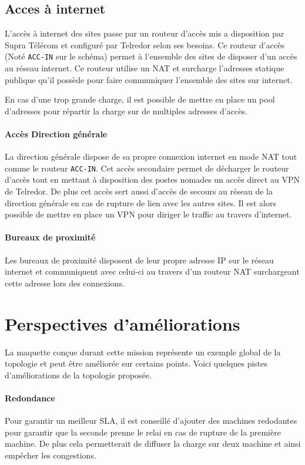\documentclass{article}
\newcommand{\tlr}{Telredor\xspace}
\newcommand{\spr}{Supra Télécom\xspace}
\begin{document}
\subsection{Acces à internet}

L'accès à internet des sites passe par un routeur d'accès mis a disposition par \spr et configuré par \tlr selon ses besoins.
Ce routeur d'accès (Noté \texttt{ACC-IN} sur le schéma) permet à l'ensemble des sites de disposer d'un accès au réseau internet.
Ce routeur utilise un NAT et surcharge l'adresses statique publique qu'il possède pour faire communiquer l'ensemble des sites sur internet.

En cas d'une trop grande charge, il est possible de mettre en place un pool d'adresses pour répartir la charge sur de multiples adresses d'accès.

\paragraph{Accès Direction générale}
La direction générale dispose de sa propre connexion internet en mode NAT tout comme le routeur \texttt{ACC-IN}.
Cet accès secondaire permet de décharger le routeur d'accès tout en mettant à disposition des postes nomades un accès direct au VPN de \tlr.
De plus cet accès sert aussi d'accès de secours au réseau de la direction générale en cas de rupture de lien avec les autres sites. Il est alors possible de mettre en place un VPN pour diriger le traffic au travers d'internet.

\paragraph{Bureaux de proximité} Les bureaux de proximité disposent de leur propre adresse IP sur le réseau internet et communiquent avec celui-ci au travers d'un routeur NAT surchargeant cette adresse lors des connexions.

\section{Perspectives d'améliorations}

La maquette conçue durant cette mission représente un exemple global de la topologie et peut être améliorée sur certains points.
Voici quelques pistes d'améliorations de la topologie proposée.

\paragraph{Redondance} Pour garantir un meilleur SLA, il est conseillé d'ajouter des machines redodantes pour garantir que la seconde prenne le relai en cas de rupture de la première machine.
De plus cela permetterait de diffuser la charge sur deux machine et ainsi empêcher les congestions.
\end{document}
